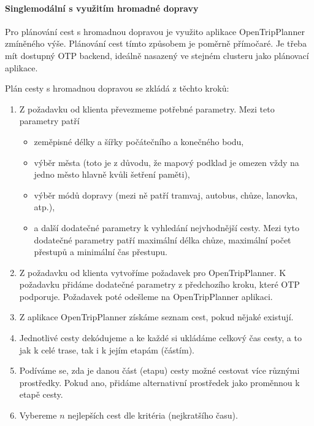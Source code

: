\documentclass[thesis=M,czech]{FITthesis}[2019/12/23]
\theoremstyle{plain}
\theoremstyle{definition}
\begin{document}
\paragraph{Singlemodální s využitím hromadné dopravy}

Pro plánování cest s hromadnou dopravou je využito aplikace OpenTripPlanner zmíněného výše. Plánování cest tímto způsobem je poměrně přímočaré. Je třeba mít dostupný OTP backend, ideálně nasazený ve stejném clusteru jako plánovací aplikace.


Plán cesty s hromadnou dopravou se zkládá z těchto kroků:



\begin{enumerate}
	\item Z požadavku od klienta převezmeme potřebné parametry. Mezi teto parametry patří
	\begin{itemize}
		\item zeměpisné délky a šířky počátečního a konečného bodu,
		\item výběr města (toto je z důvodu, že mapový podklad je omezen vždy na jedno město hlavně kvůli šetření paměti),
		\item výběr módů dopravy (mezi ně patří tramvaj, autobus, chůze, lanovka, atp.),
		\item a další dodatečné parametry k vyhledání nejvhodnější cesty. Mezi tyto dodatečné parametry patří maximální délka chůze, maximální počet přestupů a  minimální čas přestupu.
	\end{itemize}
   

	\item Z požadavku od klienta vytvoříme požadavek pro OpenTripPlanner. K požadavku přidáme dodatečné parametry z předchozího kroku, které OTP podporuje. Požadavek poté odešleme na OpenTripPlanner aplikaci. 
	\item Z aplikace OpenTripPlanner získáme seznam cest, pokud nějaké existují. 
	\item Jednotlivé cesty dekódujeme a ke každé si ukládáme celkový čas cesty, a to jak k celé trase, tak i k jejím etapám (částím). 
	\item Podíváme se, zda je danou část (etapu) cesty možné cestovat více různými prostředky. Pokud ano, přidáme alternativní prostředek jako proměnnou k etapě cesty.
	\item Vybereme $n$ nejlepších cest dle kritéria (nejkratšího času).
\end{enumerate}
\end{document}
